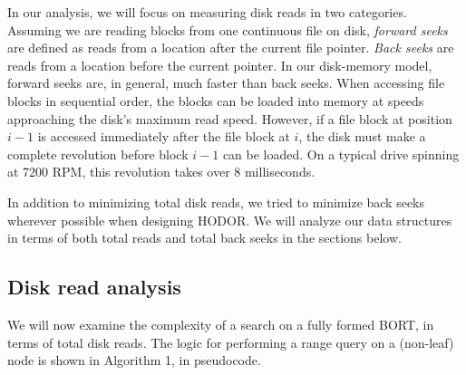 \documentclass[11pt, oneside]{article}
\begin{document}
In our analysis, we will focus on measuring disk reads in two categories.
Assuming we are reading blocks from one continuous file on disk,
\textit{forward seeks} are defined as reads from a location after the current
file pointer. \textit{Back seeks} are reads from a location before the current
pointer. In our disk-memory model, forward seeks are, in general, much faster
than back seeks. When accessing file blocks in sequential order, the blocks can
be loaded into memory at speeds approaching the disk's maximum read speed.
However, if a file block at position $i-1$ is accessed immediately after the
file block at $i$, the disk must make a complete revolution before block $i-1$
can be loaded. On a typical drive spinning at 7200 RPM, this revolution takes
over 8 milliseconds.

In addition to minimizing total disk reads, we tried to minimize back seeks
wherever possible when designing HODOR. We will analyze our data structures in
terms of both total reads and total back seeks in the sections below.

\subsection{Disk read analysis}

We will now examine the complexity of a search on a fully formed BORT, in terms
of total disk reads. The logic for performing a range query on a (non-leaf) node
is shown in Algorithm 1, in pseudocode.
\end{document}
